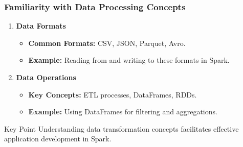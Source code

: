 \documentclass[aspectratio=169]{beamer}
\begin{document}
\begin{frame}[fragile]
    \frametitle{Familiarity with Data Processing Concepts}
    \begin{enumerate}
        \item \textbf{Data Formats}
            \begin{itemize}
                \item \textbf{Common Formats:} CSV, JSON, Parquet, Avro.
                \item \textbf{Example:} Reading from and writing to these formats in Spark.
            \end{itemize}
        
        \item \textbf{Data Operations}
            \begin{itemize}
                \item \textbf{Key Concepts:} ETL processes, DataFrames, RDDs.
                \item \textbf{Example:} Using DataFrames for filtering and aggregations.
            \end{itemize}
    \end{enumerate}
    \begin{block}{Key Point}
        Understanding data transformation concepts facilitates effective application development in Spark.
    \end{block}
\end{frame}
\end{document}
